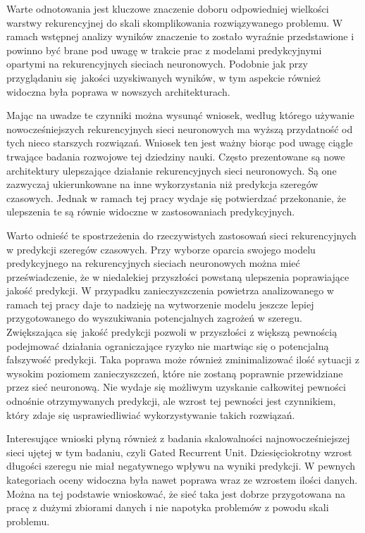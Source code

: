 \documentclass[10pt,a4paper]{article}
\begin{document}
Warte odnotowania jest kluczowe znaczenie doboru odpowiedniej wielkości warstwy rekurencyjnej do skali skomplikowania rozwiązywanego problemu. W ramach wstępnej analizy wyników znaczenie to zostało wyraźnie przedstawione i powinno być brane pod uwagę w trakcie prac z modelami predykcyjnymi opartymi na rekurencyjnych sieciach neuronowych. Podobnie jak przy przyglądaniu się jakości uzyskiwanych wyników, w tym aspekcie również widoczna była poprawa w nowszych architekturach. 

Mając na uwadze te czynniki można wysunąć wniosek, według którego używanie nowocześniejszych rekurencyjnych sieci neuronowych ma wyższą przydatność od tych nieco starszych rozwiązań. Wniosek ten jest ważny biorąc pod uwagę ciągle trwające badania rozwojowe tej dziedziny nauki. Często prezentowane są nowe architektury ulepszające działanie rekurencyjnych sieci neuronowych. Są one zazwyczaj ukierunkowane na inne wykorzystania niż predykcja szeregów czasowych. Jednak w ramach tej pracy wydaje się potwierdzać przekonanie, że ulepszenia te są równie widoczne w zastosowaniach predykcyjnych. 

Warto odnieść te spostrzeżenia do rzeczywistych zastosowań sieci rekurencyjnych w predykcji szeregów czasowych. Przy wyborze oparcia swojego modelu predykcyjnego na rekurencyjnych sieciach neuronowych można mieć przeświadczenie, że w niedalekiej przyszłości powstaną ulepszenia poprawiające jakość predykcji. W przypadku zanieczyszczenia powietrza analizowanego w ramach tej pracy daje to nadzieję na wytworzenie modelu jeszcze lepiej przygotowanego do wyszukiwania potencjalnych zagrożeń w szeregu. Zwiększająca się jakość predykcji pozwoli w przyszłości z większą pewnością podejmować działania ograniczające ryzyko nie martwiąc się o potencjalną fałszywość predykcji. Taka poprawa może również zminimalizować ilość sytuacji z wysokim poziomem zanieczyszczeń, które nie zostaną poprawnie przewidziane przez sieć neuronową. Nie wydaje się możliwym uzyskanie całkowitej pewności odnośnie otrzymywanych predykcji, ale wzrost tej pewności jest czynnikiem, który zdaje się usprawiedliwiać wykorzystywanie takich rozwiązań. 

Interesujące wnioski płyną również z badania skalowalności najnowocześniejszej sieci ujętej w tym badaniu, czyli Gated Recurrent Unit. Dziesięciokrotny wzrost długości szeregu nie miał negatywnego wpływu na wyniki predykcji. W pewnych kategoriach oceny widoczna była nawet poprawa wraz ze wzrostem ilości danych. Można na tej podstawie wnioskować, że sieć taka jest dobrze przygotowana na pracę z dużymi zbiorami danych i nie napotyka problemów z powodu skali problemu.
\end{document}
